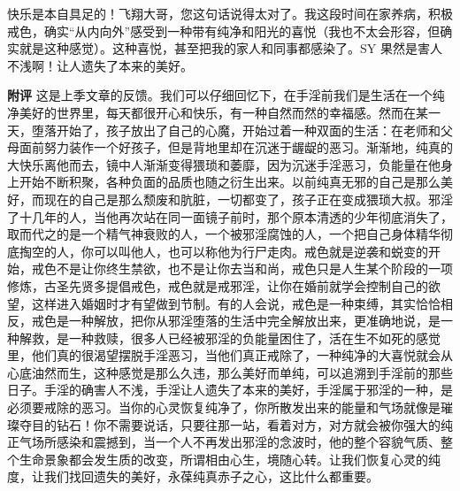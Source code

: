 \begin{case}
    快乐是本自具足的！飞翔大哥，您这句话说得太对了。我这段时间在家养病，积极戒色，确实“从内向外”感受到一种带有纯净和阳光的喜悦（我也不太会形容，但确实就是这种感觉）。这种喜悦，甚至把我的家人和同事都感染了。SY 果然是害人不浅啊！让人遗失了本来的美好。

    \textbf{附评} 这是上季文章的反馈。我们可以仔细回忆下，在手淫前我们是生活在一个纯净美好的世界里，每天都很开心和快乐，有一种自然而然的幸福感。然而在某一天，堕落开始了，孩子放出了自己的心魔，开始过着一种双面的生活：在老师和父母面前努力装作一个好孩子，但是背地里却在沉迷于龌龊的恶习。渐渐地，纯真的大快乐离他而去，镜中人渐渐变得猥琐和萎靡，因为沉迷手淫恶习，负能量在他身上开始不断积聚，各种负面的品质也随之衍生出来。以前纯真无邪的自己是那么美好，而现在的自己是那么颓废和肮脏，一切都变了，孩子正在变成猥琐大叔。邪淫了十几年的人，当他再次站在同一面镜子前时，那个原本清透的少年彻底消失了，取而代之的是一个精气神衰败的人，一个被邪淫腐蚀的人，一个把自己身体精华彻底掏空的人，你可以叫他人，也可以称他为行尸走肉。戒色就是逆袭和蜕变的开始，戒色不是让你终生禁欲，也不是让你去当和尚，戒色只是人生某个阶段的一项修炼，古圣先贤多提倡戒色，戒色就是戒邪淫，让你在婚前就学会控制自己的欲望，这样进入婚姻时才有望做到节制。有的人会说，戒色是一种束缚，其实恰恰相反，戒色是一种解放，把你从邪淫堕落的生活中完全解放出来，更准确地说，是一种解救，是一种救赎，很多人已经被邪淫的负能量困住了，活在生不如死的感觉里，他们真的很渴望摆脱手淫恶习，当他们真正戒除了，一种纯净的大喜悦就会从心底油然而生，这种感觉是那么久违，那么美好而单纯，可以追溯到手淫前的那些日子。手淫的确害人不浅，手淫让人遗失了本来的美好，手淫属于邪淫的一种，是必须要戒除的恶习。当你的心灵恢复纯净了，你所散发出来的能量和气场就像是璀璨夺目的钻石！你不需要说话，只要往那一站，看着对方，对方就会被你强大的纯正气场所感染和震撼到，当一个人不再发出邪淫的念波时，他的整个容貌气质、整个生命景象都会发生质的改变，所谓相由心生，境随心转。让我们恢复心灵的纯度，让我们找回遗失的美好，永葆纯真赤子之心，这比什么都重要。
\end{case}

